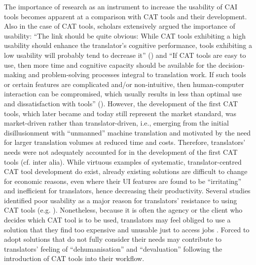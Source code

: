 The importance of research as an instrument to increase the usability of CAI tools becomes apparent at a comparison with CAT tools and their development. Also in the case of CAT tools, scholars extensively argued the importance of usability: ``The link should be quite obvious: While CAT tools exhibiting a high usability should enhance the translator’s cognitive performance, tools exhibiting a low usability will probably tend to decrease it'' (\citealt[115]{kruger2016contextualising}) and ``If CAT tools are easy to use, then more time and cognitive capacity should be available for the decision-making and problem-solving processes integral to translation work. If such tools or certain features are complicated and/or non-intuitive, then human-computer interaction can be compromised, which usually results in less than optimal use and dissatisfaction with tools''  (\citealt[2]{kappus2020ergonomics}). However, the development of the first CAT tools, which later became and today still represent the market standard, was market-driven rather than translator-driven, i.e., emerging from the initial disillusionment with ``unmanned'' machine translation and motivated by the need for larger translation volumes at reduced time and costs. Therefore, translators’ needs were not adequately accounted for in the development of the first CAT tools (cf. \citealt{moorkens2017assessing, o2017irritating} inter alia). While virtuous examples of systematic, translator-centred CAT tool development do exist, already existing solutions are difficult to change for economic reasons, even where their UI features are found to be ``irritating'' \citep{o2017irritating} and inefficient for translators, hence decreasing their productivity. Several studies identified poor usability as a major reason for translators’ resistance to using CAT tools (e.g. \citealt{leblanc2013translators,o2017irritating}). Nonetheless, because it is often the agency or the client who decides which CAT tool is to be used, translators may feel obliged to use a solution that they find too expensive and unusable just to access jobs \citep{garcia2015computer}. Forced to adopt solutions that do not fully consider their needs may contribute to translators’ feeling of ``dehumanisation'' and ``devaluation'' \citep{o2012translation} following the introduction of CAT tools into their workflow. 

